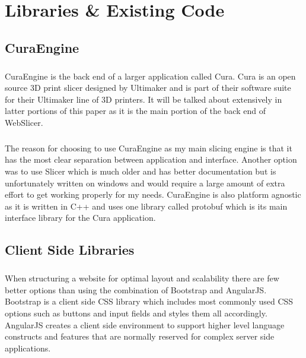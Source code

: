 \chapter{Libraries \& Existing Code}

\section{CuraEngine}
\paragraph{}
CuraEngine is the back end of a larger application called Cura.
Cura is an open source 3D print slicer designed by Ultimaker and is part of their software suite for their Ultimaker line of 3D printers.
It will be talked about extensively in latter portions of this paper as it is the main portion of the back end of WebSlicer.

\paragraph{}
The reason for choosing to use CuraEngine as my main slicing engine is that it has the most clear separation between application and interface.
Another option was to use Slicer which is much older and has better documentation but is unfortunately written on windows and would require a large amount of extra effort to get working properly for my needs.
CuraEngine is also platform agnostic as it is written in C++ and uses one library called protobuf which is its main interface library for the Cura application.

\section{Client Side Libraries}
\paragraph{}
When structuring a website for optimal layout and scalability there are few better options than using the combination of Bootstrap and AngularJS.
Bootstrap is a client side CSS library which includes most commonly used CSS options such as buttons and input fields and styles them all accordingly.
AngularJS creates a client side environment to support higher level language constructs and features that are normally reserved for complex server side applications.

